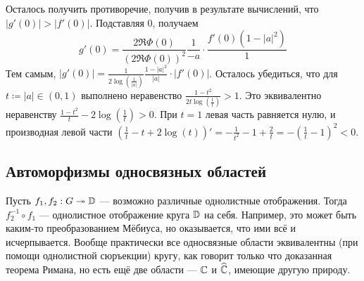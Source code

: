 \documentclass[a4paper]{report}
\begin{document}
{{{                \item Осталось получить противоречие, получив в результате вычислений, что $|g'(0)| > |f'(0)|$.
                Подставляя $0$, получаем
                \[g'(0) = \frac{2\Re\Phi(0)}{(2\Re\Phi(0))^2}\frac{1}{-a} \cdot \frac{f'(0)(1 - |a|^2)}{1}\]
                Тем самым, $|g'(0)| = \frac{1}{2 \log\left(\frac{1}{|a|}\right)}\frac{1 - |a|^2}{|a|} \cdot |f'(0)|$.
                Осталось убедиться, что для $t \coloneqq |a| \in (0, 1)$ выполнено неравенство $\frac{1 - t^2}{2t \log\left(\frac{1}{t}\right)} > 1$.
                Это эквивалентно неравенству $\frac{1 - t^2}{t} - 2\log\left(\frac{1}{t}\right) > 0$.
                При $t = 1$ левая часть равняется нулю, и производная левой части $\left(\frac{1}{t} - t + 2\log\left(t\right)\right)' = -\frac{1}{t^2} - 1 + \frac{2}{t} = -\left(\frac{1}{t} - 1\right)^2 < 0$.
            }
        }
    }
    \subsection{Автоморфизмы односвязных областей}
    Пусть $f_1, f_2: G \twoheadrightarrow \mathbb{D}$ --- возможно различные однолистные отображения.
    Тогда $f_2^{-1} \circ f_1$ --- однолистное отображение круга $\mathbb{D}$ на себя.
    Например, это может быть каким-то преобразованием Мёбиуса, но оказывается, что ими всё и исчерпывается.
    Вообще практически все односвязные области эквивалентны (при помощи однолистной сюръекции) кругу, как говорит только что доказанная теорема Римана, но есть ещё две области --- $\mathbb{C}$ и $\widehat{\mathbb{C}}$, имеющие другую природу.
\end{document}
